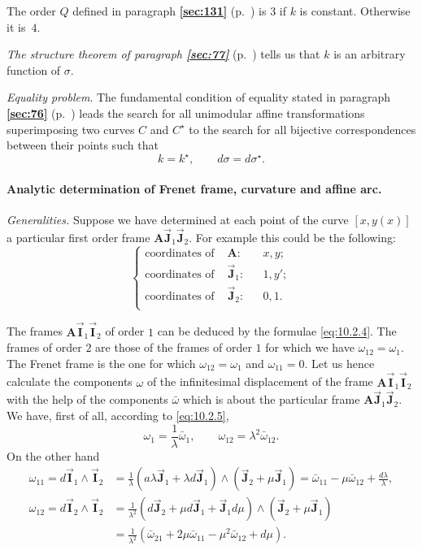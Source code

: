 \documentclass[leqno,11pt]{book}
\numberwithin{equation}{chapter}
\theoremstyle{shape1}
\theoremstyle{shapesmall}
\newcommand{\fsref}[1]{{\rm\textsection\textbf{\ref{sec:#1}}}}
\newcommand{\str}{^{\star}}
\newcommand{\rvec}[1]{\vec{\mathbf{#1}}}
\newcommand{\ivec}{\rvec{I}}
\newcommand{\jvec}{\rvec{J}}
\newcommand{\somespace}{\vspace{9pt}}
\begin{document}
The order $Q$ defined in paragraph \fsref{131} (p.~\pageref{sec:131}) is $3$ if $k$ is constant. Otherwise it is~$4$.

\emph{The structure theorem of paragraph \fsref{77}} (p.~\pageref{sec:77}) tells us that $k$ is an arbitrary function of $\sigma$.

\somespace

\emph{Equality problem}. The fundamental condition of equality stated in paragraph \fsref{76} (p.~\pageref{sec:76}) leads the search for all unimodular affine transformations superimposing two curves $C$ and $C\str$ to the search for all bijective correspondences between their points such that
\[
k=k\str,\qquad d\sigma=d\sigma\str.
\]

\paragraph{Analytic determination of Frenet frame, curvature and affine arc.}
\label{sec:138}
\emph{Generalities.} Suppose we have determined at each point of the curve $[x,y(x)]$ a particular first order frame $\mathbf{A}\jvec_{1}\jvec_{2}$. For example this could be the following:
\begin{equation}
  \label{eq:10.2.9}
  \left\{
    \begin{aligned}
      \text{coordinates of }&\mathbf{A}:&&x,y;\\
      \text{coordinates of }&\jvec_{1}:&&1,y';\\
      \text{coordinates of }&\jvec_{2}:&&0,1.\\      
    \end{aligned}
  \right.
\end{equation}

The frames $\mathbf{A}\ivec_{1}\ivec_{2}$ of order $1$ can be deduced by the formulae \eqref{eq:10.2.4}. The frames of order $2$ are those of the frames of order $1$ for which we have $\omega_{12}=\omega_{1}$. The Frenet frame is the one for which $\omega_{12}=\omega_{1}$ and $\omega_{11}=0$. Let us hence calculate the components $\omega$ of the infinitesimal displacement of the frame $\mathbf{A}\ivec_{1}\ivec_{2}$ with the help of the components $\bar \omega$ which is about the particular frame $\mathbf{A}\jvec_{1}\jvec_{2}$. We have, first of all, according to \eqref{eq:10.2.5},
\[
\omega_{1}=\frac{1}{\lambda}\bar\omega_{1},\qquad\omega_{12}=\lambda^{2}\bar\omega_{12}.
\]
On the other hand
\begin{align*}
  \omega_{11}=d\ivec_{1}\wedge\ivec_{2}&=\frac{1}{\lambda}(a\lambda\jvec_{1}+\lambda d\jvec_{1})\wedge(\jvec_{2}+\mu\jvec_{1})=\bar\omega_{11}-\mu\bar\omega_{12}+\frac{d\lambda}{\lambda},\\
  \omega_{12}=d\ivec_{2}\wedge\ivec_{2}&=\frac{1}{\lambda^{2}}(d\jvec_{2}+\mu d\jvec_{1}+\jvec_{1}d\mu)\wedge(\jvec_{2}+\mu\jvec_{1})\\
  &=\frac{1}{\lambda^{2}}(\bar\omega_{21}+2\mu\bar\omega_{11}-\mu^{2}\bar\omega_{12}+d\mu).
\end{align*}
\end{document}
